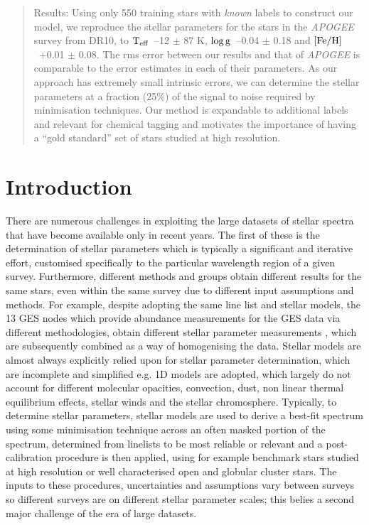 \documentclass[12pt, preprint]{aastex}
\newcommand{\teff}{\mbox{$\rm T_{eff}$}}
\newcommand{\feh}{\mbox{$\rm [Fe/H]$}}
\newcommand{\logg}{\mbox{$\rm \log g$}}
\begin{document}
\begin{abstract}
Results:   Using only 550 training stars with \textit{known} labels to construct our model, we reproduce the stellar parameters for the stars in the \textit{APOGEE} survey from DR10, to \teff\ --12 $\pm$ 87 K, \logg\ --0.04 $\pm$ 0.18 and \feh\ +0.01 $\pm$ 0.08. The rms error between our results and that of \textit{APOGEE} is comparable to the error estimates in each of their parameters. As our approach has extremely small intrinsic errors,  we can determine the stellar parameters at a fraction (25\%) of the signal to noise required by minimisation techniques. Our method is expandable to additional labels and relevant for chemical tagging and motivates the importance of having a ``gold standard'' set of stars studied at high resolution. 



\end{abstract}

\section{Introduction}

There are numerous challenges in exploiting the large datasets of stellar spectra that have become available only in recent years. The first of these is the determination of stellar parameters which is typically a significant and iterative effort, customised specifically to the particular wavelength region of a given survey. Furthermore, different methods and groups obtain different results for the same stars, even within the same survey due to different input assumptions and methods. For example, despite adopting the same line list and stellar models, the 13 GES nodes which provide abundance measurements for the GES data via different methodologies, obtain different stellar parameter measurements  \citep{Smiljanic2014}, which are subsequently combined as a way of homogenising the data.  Stellar models are almost always explicitly relied upon for stellar parameter determination, which are incomplete and simplified e.g. 1D models are adopted, which  largely do not account for different molecular opacities, convection, dust, non linear thermal equilibrium effects, stellar winds and the stellar chromosphere. Typically, to determine stellar parameters, stellar models are used to derive a best-fit spectrum using some minimisation technique across an often masked portion of the spectrum, determined from linelists to be most reliable or relevant and a post-calibration procedure is then applied, using for example benchmark stars studied at high resolution or well characterised open and globular cluster stars. The inputs to these procedures, uncertainties and assumptions vary between surveys so different surveys are on different stellar parameter scales; this belies a second major challenge of the era of large datasets. 
\end{document}
